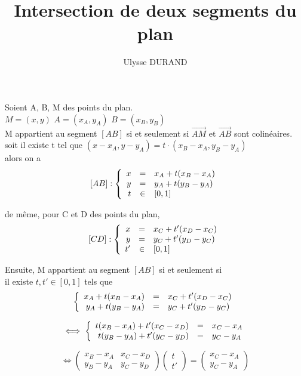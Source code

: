 \documentclass[10pt,fleqn]{article}
\title {\textbf{Intersection de deux segments du plan}}
\date {}
\author {Ulysse DURAND}
\begin{document}
\maketitle
Soient A, B, M des points du plan. \\
$M=(x,y)$ $A=(x_A,y_A)$ $B=(x_B,y_B)$\\
M appartient au segment $ [AB] $ si et seulement si $ \overrightarrow{AM}$ et $\overrightarrow{AB}$ sont colin\'eaires.\\
soit il existe t tel que $(x-x_A,y-y_A)=t\cdot(x_B-x_A,y_B-y_A)$\\
alors on a
\[[AB]:\left\{\begin{array}{r c l}
x &=& x_A+t(x_B-x_A)\\
y &=& y_A+t(y_B-y_A)\\
t &\in& [0,1]
\end{array}\right.\]

de m\^eme, pour C et D des points du plan,
\[[CD]:\left\{\begin{array}{r c l}
x &=& x_C+t'(x_D-x_C)\\
y &=& y_C+t'(y_D-y_C)\\
t' &\in& [0,1]
\end{array}\right.\]

Ensuite, M appartient au segment $[AB]$ si et seulement si \\
il existe $t,t' \in [0,1]$ tels que
\[\left\{\begin{array}{r c l}
x_A+t(x_B-x_A) &=& x_C+t'(x_D-x_C)\\
y_A+t(y_B-y_A) &=& y_C+t'(y_D-y_C)
\end{array}\right.\]

\[\iff\left\{\begin{array}{r c l}
t(x_B-x_A)+t'(x_C-x_D) &=& x_C-x_A\\
t(y_B-y_A)+t'(y_C-y_D) &=& y_C-y_A
\end{array}\right.\]

\[\iff\begin{pmatrix}
	x_B-x_A & x_C-x_D\\
	y_B-y_A & y_C-y_D
\end{pmatrix}
\begin{pmatrix}t\\t'\end{pmatrix}
=\begin{pmatrix}x_C-x_A\\y_C-y_A\end{pmatrix}\]
\end{document}
